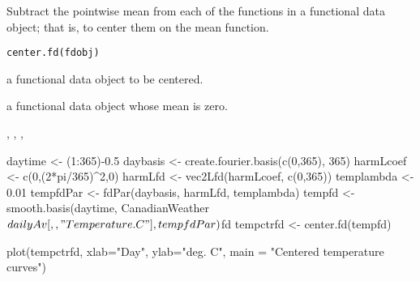 \begin{Description}\relax
Subtract the pointwise mean from each of the functions
in a functional data object; that is, to center them on the mean function.
\end{Description}
\begin{Usage}
\begin{verbatim}
center.fd(fdobj)
\end{verbatim}
\end{Usage}
\begin{Arguments}
\begin{ldescription}
\item[\code{fdobj}] a functional data object to be centered.

\end{ldescription}
\end{Arguments}
\begin{Value}
a functional data object whose mean is zero.
\end{Value}
\begin{SeeAlso}\relax
{}, 
, 
, 
\end{SeeAlso}
\begin{Examples}
\begin{ExampleCode}
daytime    <- (1:365)-0.5
daybasis   <- create.fourier.basis(c(0,365), 365)
harmLcoef  <- c(0,(2*pi/365)^2,0)
harmLfd    <- vec2Lfd(harmLcoef, c(0,365))
templambda <- 0.01
tempfdPar  <- fdPar(daybasis, harmLfd, templambda)
tempfd     <- smooth.basis(daytime,
       CanadianWeather$dailyAv[,,"Temperature.C"], tempfdPar)$fd
tempctrfd  <- center.fd(tempfd)

plot(tempctrfd, xlab="Day", ylab="deg. C",
     main = "Centered temperature curves")
\end{ExampleCode}
\end{Examples}

